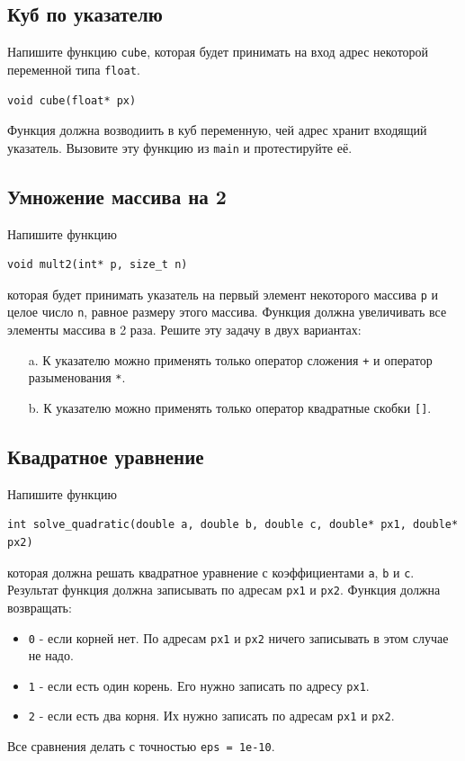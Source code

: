 \documentclass[10pt]{article}
\begin{document}
\subsection{Куб по указателю}
Напишите функцию \texttt{cube}, которая будет принимать на вход адрес некоторой переменной типа \texttt{float}. 
\begin{lstlisting}
void cube(float* px)
\end{lstlisting}
Функция должна возводиить в куб переменную, чей адрес хранит входящий указатель. Вызовите эту функцию из \texttt{main} и протестируйте её.

\subsection{Умножение массива на 2}
Напишите функцию
\begin{lstlisting}
void mult2(int* p, size_t n)
\end{lstlisting}
которая будет принимать указатель на первый элемент некоторого массива \texttt{p} и целое число \texttt{n}, равное размеру этого массива. Функция должна увеличивать все элементы массива в 2 раза.
Решите эту задачу в двух вариантах:
\begin{enumerate}
\item[a.] К указателю можно применять только оператор сложения \texttt{+} и оператор разыменования \texttt{*}.
\item[b.] К указателю можно применять только оператор квадратные скобки \texttt{[]}.
\end{enumerate}



\subsection{Квадратное уравнение}
Напишите функцию
\begin{lstlisting}
int solve_quadratic(double a, double b, double c, double* px1, double* px2)
\end{lstlisting}
которая должна решать квадратное уравнение с коэффициентами \texttt{a}, \texttt{b} и \texttt{c}. Результат функция должна записывать по адресам \texttt{px1} и \texttt{px2}. Функция должна возвращать:
\begin{itemize}
\item \texttt{0} - если корней нет. По адресам \texttt{px1} и \texttt{px2} ничего записывать в этом случае не надо.
\item \texttt{1} - если есть один корень. Его нужно записать по адресу \texttt{px1}.
\item \texttt{2} - если есть два корня. Их нужно записать по адресам \texttt{px1} и \texttt{px2}.
\end{itemize}
Все сравнения делать с точностью \texttt{eps = 1e-10}.
\end{document}

